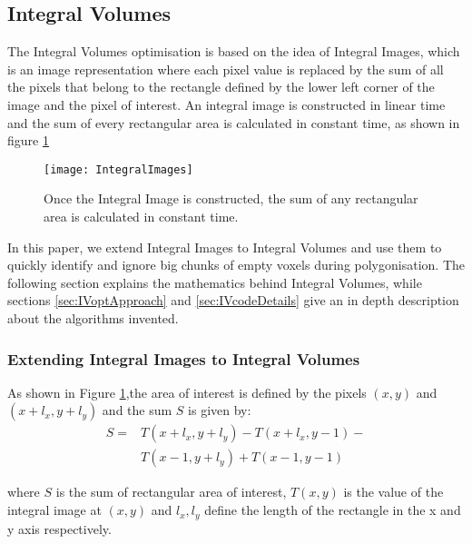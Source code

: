 \documentclass{subfiles}
\begin{document}
\subsection{Integral Volumes}\label{sec:IVopt}
The Integral Volumes optimisation is based on the idea of Integral Images, which is an image representation where each pixel value is replaced by the sum of all the pixels that belong to the rectangle defined by the lower left corner of the image and the pixel of interest.  An integral image is constructed in linear time and the sum of every rectangular area is calculated in constant time, as shown in figure \ref{fig:IntegralImages} \cite{Crow1984}


\begin{figure}[!htbp]
	\centering
	\texttt{[image: IntegralImages]}
	\caption[Integral Image]{Once the Integral Image is constructed, the sum of any rectangular area is calculated in constant time.}
	\label{fig:IntegralImages}
\end{figure}


In this paper, we extend Integral Images to Integral Volumes and use them to quickly identify and ignore big chunks of empty voxels during polygonisation. The following section explains the mathematics behind Integral Volumes, while sections \ref{sec:IVoptApproach}  and \ref{sec:IVcodeDetails} give an in depth description about the algorithms invented. 

\subsubsection{Extending Integral Images to Integral Volumes}\label{sec:extendingIV}

As shown in Figure \ref{fig:IntegralImages},the area of interest is defined by the pixels $(x, y)$ and $(x+l_x, y+l_y)$ and the sum $S$ is given by: 
\begin{equation}
\begin{split}
S = & T(x+l_x,y+l_y) - 
T(x+l_x,y-1)- \\
&  T(x-1,y+l_y) +
T(x-1,y-1)
\end{split}
\label{eq:IntegralImage}
\end{equation}

where 	$S$ is the sum of rectangular area of interest, $T(x, y)$ is the value of the integral image at $(x, y)$ and $l_x, l_y$ define the length of the rectangle in the x and y axis respectively. 
\end{document}

